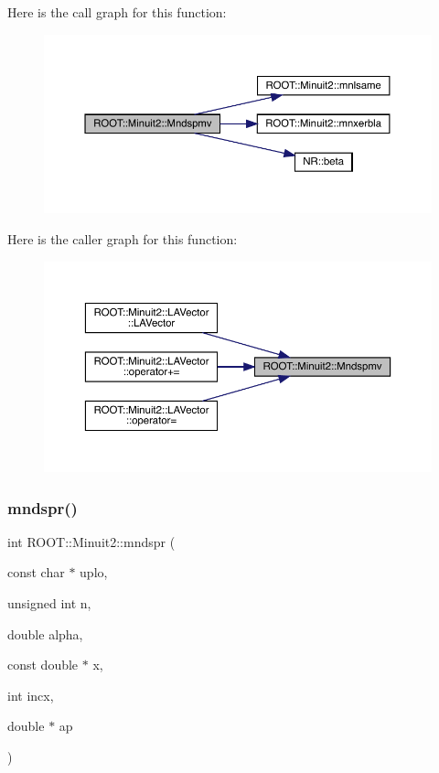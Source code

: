 Here is the call graph for this function\+:\nopagebreak
\begin{figure}[H]
\begin{center}
\leavevmode
\includegraphics[width=350pt]{d6/d3a/namespaceROOT_1_1Minuit2_ad193f5f7fa4c96ebf1fe98c72ab22ca2_cgraph}
\end{center}
\end{figure}
Here is the caller graph for this function\+:\nopagebreak
\begin{figure}[H]
\begin{center}
\leavevmode
\includegraphics[width=350pt]{d6/d3a/namespaceROOT_1_1Minuit2_ad193f5f7fa4c96ebf1fe98c72ab22ca2_icgraph}
\end{center}
\end{figure}
\mbox{\label{namespaceROOT_1_1Minuit2_acc89c3c759da8dc191d0a862e354a555}} 
\subsubsection{\texorpdfstring{mndspr()}{mndspr()}}
{\footnotesize\ttfamily int R\+O\+O\+T\+::\+Minuit2\+::mndspr (\begin{DoxyParamCaption}\item[{const char $\ast$}]{uplo,  }\item[{unsigned int}]{n,  }\item[{double}]{alpha,  }\item[{const double $\ast$}]{x,  }\item[{int}]{incx,  }\item[{double $\ast$}]{ap }\end{DoxyParamCaption})}

